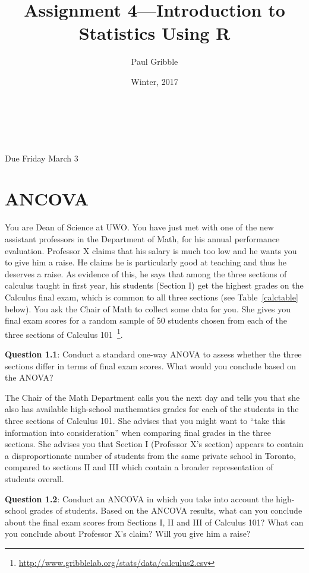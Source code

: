 \documentclass[10pt]{article}
\title{Assignment 4---Introduction to Statistics Using R}
\author{Paul Gribble}
\date{Winter, 2017}
\makeatletter
\renewcommand{\maketitle}{
\begin{flushleft}          %
{\Large\sffamily\bfseries\@title}   %
\vspace{3ex}\\            %
{\normalsize\sffamily\@author}           %
\vspace{0ex}\\             %
\normalsize\sffamily\@date                     %
\vspace{5ex}              %
\end{flushleft}
}
\makeatother
\begin{document}
\maketitle

\thispagestyle{empty}

{\flushleft \sffamily * Due Friday March 3}

\section{ANCOVA}

You are Dean of Science at UWO. You have just met with one of the new
assistant professors in the Department of Math, for his annual
performance evaluation. Professor X claims that his salary is much too
low and he wants you to give him a raise. He claims he is particularly
good at teaching and thus he deserves a raise. As evidence of this, he
says that among the three sections of calculus taught in first year,
his students (Section I) get the highest grades on the Calculus final
exam, which is common to all three sections (see Table~\ref{calctable}
below). You ask the Chair of Math to collect some data for you. She
gives you final exam scores for a random sample of 50 students chosen
from each of the three sections of Calculus
101~\footnote{\url{http://www.gribblelab.org/stats/data/calculus2.csv}}.

\textbf{Question 1.1}: Conduct a standard one-way ANOVA to assess
whether the three sections differ in terms of final exam scores. What
would you conclude based on the ANOVA?

The Chair of the Math Department calls you the next day and tells you
that she also has available high-school mathematics grades for each of
the students in the three sections of Calculus 101. She advises that
you might want to ``take this information into consideration'' when
comparing final grades in the three sections. She advises you that
Section I (Professor X's section) appears to contain a
disproportionate number of students from the same private school in
Toronto, compared to sections II and III which contain a broader
representation of students overall.

\textbf{Question 1.2}: Conduct an ANCOVA in which you take into
account the high-school grades of students. Based on the ANCOVA
results, what can you conclude about the final exam scores from
Sections I, II and III of Calculus 101?  What can you conclude about
Professor X's claim? Will you give him a raise?
\end{document}
